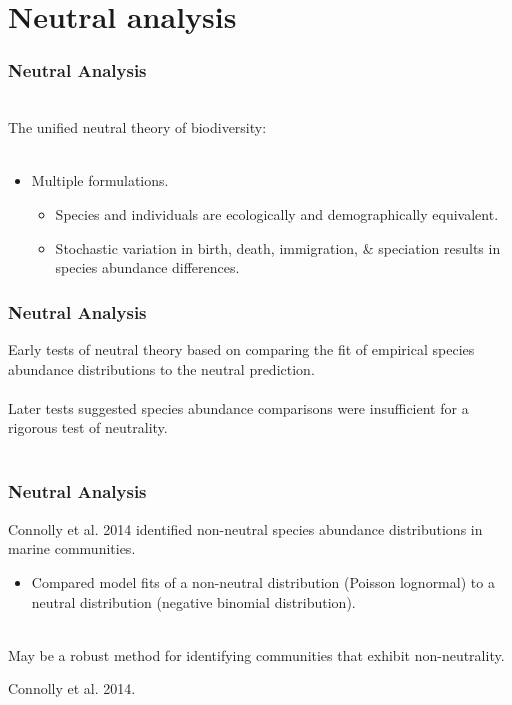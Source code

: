 \documentclass[14pt]{beamer}
\begin{document}
\section{Neutral analysis}
\begin{frame}[t]
\frametitle{Neutral Analysis}
~\\
The unified neutral theory of biodiversity:\\
~\\
\begin{itemize}
\item Multiple formulations.
\begin{itemize}
\item Species and individuals are ecologically and demographically equivalent.\\
\item Stochastic variation in birth, death, immigration, \& speciation results in species abundance differences.
\end{itemize}
\end{itemize}
\end{frame}

\begin{frame}
\frametitle{Neutral Analysis}
Early tests of neutral theory based on comparing the fit of empirical species abundance distributions to the neutral prediction.\\
~\\
Later tests suggested species abundance comparisons were insufficient for a rigorous test of neutrality.\\
~\\
\end{frame}

\begin{frame}
\frametitle{Neutral Analysis}
Connolly et al. 2014 identified non-neutral species abundance distributions in marine communities.\\
\begin{small}
\begin{itemize}
\item Compared model fits of a non-neutral distribution (Poisson lognormal) to a neutral distribution (negative binomial distribution).\\
\end{itemize}
\end{small}
~\\
May be a robust method for identifying communities that exhibit non-neutrality.\\
\begin{tiny}
Connolly et al. 2014.
\end{tiny}
\end{frame}
\end{document}
